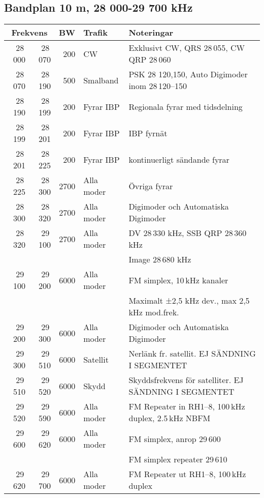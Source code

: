 {\small
\subsection{Bandplan 10 m, 28 000-29 700 kHz}
\begin{tabular}{rrrll}
\multicolumn{2}{c}{\textbf{Frekvens}} & \textbf{BW} & \textbf{Trafik} & \textbf{Noteringar} \\ \hline
28\,000 & 28\,070 & 200  & CW         & Exklusivt CW, QRS 28\,055, CW QRP 28\,060              \\ \hline
28\,070 & 28\,190 & 500  & Smalband   & PSK 28 120,150, Auto Digimoder inom 28\,120--150       \\ \hline
28\,190 & 28\,199 & 200  & Fyrar IBP  & Regionala fyrar med tidsdelning                        \\ \hline
28\,199 & 28\,201 & 200  & Fyrar IBP  & IBP fyrnät                                             \\ \hline
28\,201 & 28\,225 & 200  & Fyrar IBP  & kontinuerligt sändande fyrar                           \\ \hline
28\,225 & 28\,300 & 2700 & Alla moder & Övriga fyrar                                           \\ \hline
28\,300 & 28\,320 & 2700 & Alla moder & Digimoder och Automatiska Digimoder                    \\ \hline
28\,320 & 29\,100 & 2700 & Alla moder & DV 28\,330 kHz, SSB QRP 28\,360 kHz                    \\
        &         &      &            & Image 28\,680 kHz                                      \\ \hline
29\,100 & 29\,200 & 6000 & Alla moder & FM simplex, 10\,kHz kanaler                            \\
        &         &      &            & Maximalt ±2,5 kHz dev., max 2,5\,kHz mod.frek.         \\ \hline
29\,200 & 29\,300 & 6000 & Alla moder & Digimoder och Automatiska Digimoder                    \\ \hline
29\,300 & 29\,510 & 6000 & Satellit   & Nerlänk fr. satellit. EJ SÄNDNING I SEGMENTET          \\ \hline
29\,510 & 29\,520 & 6000 & Skydd      & Skyddsfrekvens för satelliter. EJ SÄNDNING I SEGMENTET \\ \hline
29\,520 & 29\,590 & 6000 & Alla moder & FM Repeater in RH1--8, 100\,kHz duplex, 2.5\,kHz NBFM  \\ \hline
29\,600 & 29\,620 & 6000 & Alla moder & FM simplex, anrop 29\,600                              \\
        &         &      &            & FM simplex repeater 29\,610                            \\ \hline
29\,620 & 29\,700 & 6000 & Alla moder & FM Repeater ut RH1--8, 100\,kHz duplex                 \\ \hline
\end{tabular}
\normalsize

}

